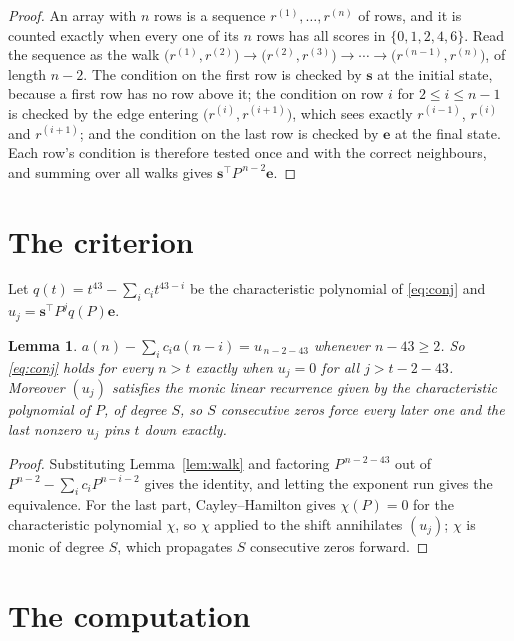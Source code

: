 \documentclass[11pt,a4paper]{article}
\theoremstyle{plain}
\newtheorem{lemma}[theorem]{Lemma}
\theoremstyle{definition}
\begin{document}
\begin{proof}
An array with $n$ rows is a sequence $r^{(1)},\dots,r^{(n)}$ of rows, and it is counted
exactly when every one of its $n$ rows has all scores in $\{0,1,2,4,6\}$. Read the sequence as the
walk $\bigl(r^{(1)},r^{(2)}\bigr)\to\bigl(r^{(2)},r^{(3)}\bigr)\to\cdots\to
\bigl(r^{(n-1)},r^{(n)}\bigr)$, of length $n-2$. The condition on the first row is
checked by $\mathbf{s}$ at the initial state, because a first row has no row above it; the
condition on row $i$ for $2\le i\le n-1$ is checked by the edge entering
$\bigl(r^{(i)},r^{(i+1)}\bigr)$, which sees exactly $r^{(i-1)}$, $r^{(i)}$ and
$r^{(i+1)}$; and the condition on the last row is checked by $\mathbf{e}$ at the final
state. Each row's condition is therefore tested once and with the correct neighbours, and
summing over all walks gives $\mathbf{s}^{\!\top}P^{\,n-2}\mathbf{e}$.
\end{proof}

\section{The criterion}

Let $q(t)=t^{43}-\sum_i c_i t^{43-i}$ be the characteristic polynomial of
\eqref{eq:conj} and $u_j=\mathbf{s}^{\!\top}P^{j}q(P)\mathbf{e}$.

\begin{lemma}\label{lem:crit}
$a(n)-\sum_i c_i a(n-i)=u_{\,n-2-43}$ whenever $n-43\ge2$. So \eqref{eq:conj}
holds for every $n>t$ exactly when $u_j=0$ for all $j>t-2-43$. Moreover $(u_j)$
satisfies the monic linear recurrence given by the characteristic polynomial of $P$, of
degree $S$, so $S$ consecutive zeros force every later one and the last nonzero $u_j$ pins
$t$ down exactly.
\end{lemma}

\begin{proof}
Substituting Lemma~\ref{lem:walk} and factoring $P^{\,n-2-43}$ out of
$P^{n-2}-\sum_i c_i P^{n-i-2}$ gives the identity, and letting the exponent run gives the
equivalence. For the last part, Cayley--Hamilton gives $\chi(P)=0$ for the characteristic
polynomial $\chi$, so $\chi$ applied to the shift annihilates $(u_j)$; $\chi$ is monic of
degree $S$, which propagates $S$ consecutive zeros forward.
\end{proof}

\section{The computation}
\end{document}

